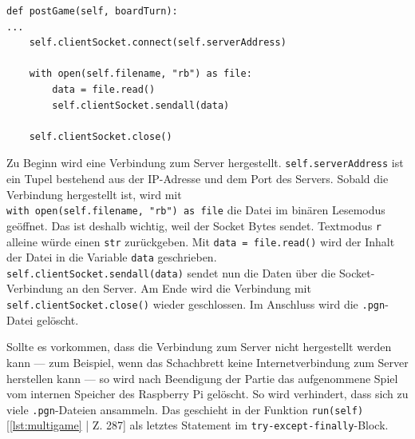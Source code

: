 \begin{scriptsize}
\begin{lstlisting}[captionpos=b, caption={Funktion zum Übermitteln der PGN-Datei an den Server}, label={lst:postGameSocket}]
def postGame(self, boardTurn):
...
    self.clientSocket.connect(self.serverAddress)

    with open(self.filename, "rb") as file:
        data = file.read()
        self.clientSocket.sendall(data)

    self.clientSocket.close()
\end{lstlisting}
\end{scriptsize}

Zu Beginn wird eine Verbindung zum Server hergestellt. \verb|self.serverAddress| ist ein Tupel bestehend aus der 
IP-Adresse und dem Port des Servers. Sobald die Verbindung hergestellt ist, wird mit\\\verb|with open(self.filename, "rb") as file| 
die Datei im binären Lesemodus geöffnet. Das ist deshalb wichtig, weil der Socket Bytes sendet. Textmodus \verb|r| 
alleine würde einen \verb|str| zurückgeben. Mit \verb|data = file.read()| wird der Inhalt der Datei in die Variable 
\verb|data| geschrieben.\\\verb|self.clientSocket.sendall(data)| sendet nun die Daten über die Socket-Verbindung an 
den Server. Am Ende wird die Verbindung mit\\\verb|self.clientSocket.close()| wieder geschlossen. Im Anschluss wird 
die \verb|.pgn|-Datei gelöscht.

Sollte es vorkommen, dass die Verbindung zum Server nicht hergestellt werden kann — zum Beispiel, wenn das Schachbrett 
keine Internetverbindung zum Server herstellen kann — so wird nach Beendigung der Partie das aufgenommene Spiel vom 
internen Speicher des Raspberry Pi gelöscht. So wird verhindert, dass sich zu viele \verb|.pgn|-Dateien ansammeln.
Das geschieht in der Funktion \verb|run(self)| [\ref{lst:multigame} | Z. 287] als letztes Statement im \verb|try-except-finally|-Block.
